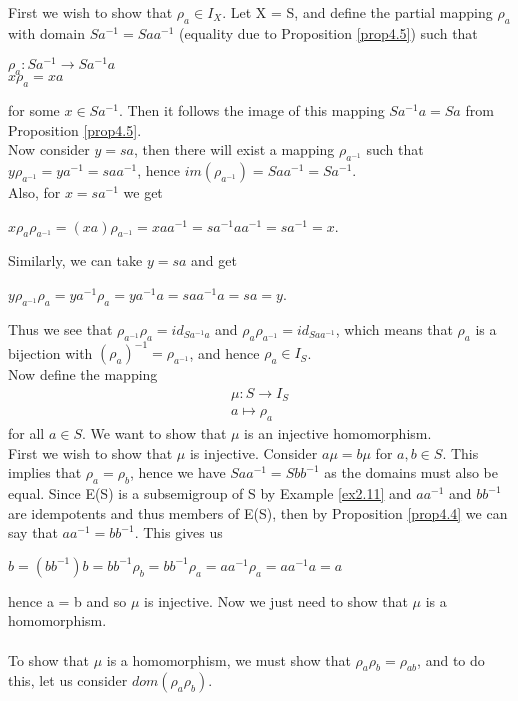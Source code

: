 \documentclass[12pt]{article}
\begin{document}
\proof First we wish to show that $\rho_a \in I_X$.
	Let X = S, and define the partial mapping $\rho_a$ with domain $Sa^{-1}=Saa^{-1}$ (equality due to Proposition \ref{prop4.5}) such that
	\begin{center}	
			 $\rho_a:Sa^{-1} \to Sa^{-1}a$\\
		\quad	 $x\rho_a = xa$
	\end{center}
	for some $x \in Sa^{-1}$. Then it follows the image of this mapping $Sa^{-1}a = Sa$ from Proposition \ref{prop4.5}.\\
	Now consider $y=sa$, then there will exist a mapping $\rho_{a^{-1}}$ such that $y\rho_{a^{-1}} = ya^{-1} = saa^{-1}$, hence $im(\rho_{a^{-1}}) = Saa^{-1} = Sa^{-1}$.\\
	Also, for $x = sa^{-1}$ we get
		\begin{center}
			 $x \rho_a \rho_{a^{-1}} = (xa) \rho_{a^{-1}} = xaa^{-1} = sa^{-1}aa^{-1} = sa^{-1} = x$.
		\end{center}
	Similarly, we can take $y=sa$ and get
		\begin{center}
			$y \rho_{a^{-1}}\rho_a=ya^{-1}\rho_a=ya^{-1}a=saa^{-1}a=sa=y$.
		\end{center}
	Thus we see that $ \rho_{a^{-1}} \rho_a = id_{Sa^{-1}a}$ and $\rho_a \rho_{a^{-1}}=id_{Saa^{-1}}$, which means that $\rho_a$ is a bijection with $(\rho_a)^{-1}= \rho_{a^{-1}}$, and hence $\rho_a \in I_S$.\\
	Now define the mapping 
		\begin{align*}
			\mu:S \to I_S\\
			a \mapsto \rho_a
		\end{align*}
	for all $a \in S$. We want to show that $\mu$ is an injective homomorphism.
	\\First we wish to show that $\mu$ is injective. Consider $a\mu = b\mu$ for $a,b \in S$. This implies that $\rho_a = \rho_b$, hence we have $Saa^{-1} = Sbb^{-1}$ as the domains must also be equal. Since E(S) is a subsemigroup of S by Example \ref{ex2.11} and $aa^{-1}$ and $bb^{-1}$ are idempotents and thus members of E(S), then by Proposition \ref{prop4.4} we can say that $aa^{-1} = bb^{-1}$. This gives us
	\begin{center}
		$b = (bb^{-1})b = bb^{-1}\rho_b = bb^{-1}\rho_a=aa^{-1}\rho_a=aa^{-1}a=a$
	\end{center}
	hence a = b and so $\mu$ is injective. Now we just need to show that $\mu$ is a homomorphism.\\
	\\To show that $\mu$ is a homomorphism, we must show that $\rho_a\rho_b = \rho_{ab}$, and to do this, let us consider $dom(\rho_a \rho_b)$.
\end{document}
